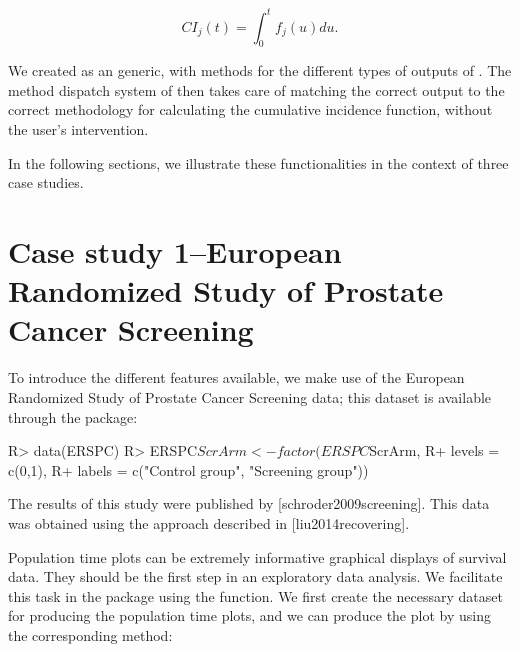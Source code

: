 \documentclass[
]{jss}
\begin{document}
\[ CI_j(t) = \int_0^t f_j(u)du.\]

We created  as an  generic, with methods for
the different types of outputs of . The method
dispatch system of  then takes care of matching the correct
output to the correct methodology for calculating the cumulative
incidence function, without the user's intervention.

In the following sections, we illustrate these functionalities in the
context of three case studies.

\hypertarget{case-study-1european-randomized-study-of-prostate-cancer-screening}{%
\section{Case study 1--European Randomized Study of Prostate Cancer
Screening}\label{case-study-1european-randomized-study-of-prostate-cancer-screening}}

To introduce the different features available, we make use of the
European Randomized Study of Prostate Cancer Screening data; this
dataset is available through the  package:

\begin{CodeChunk}

\begin{CodeInput}
R> data(ERSPC)
R> ERSPC$ScrArm <- factor(ERSPC$ScrArm, 
R+                        levels = c(0,1), 
R+                        labels = c("Control group", "Screening group"))
\end{CodeInput}
\end{CodeChunk}

The results of this study were published by {[}schroder2009screening{]}.
This data was obtained using the approach described in
{[}liu2014recovering{]}.

Population time plots can be extremely informative graphical displays of
survival data. They should be the first step in an exploratory data
analysis. We facilitate this task in the  package using
the  function. We first create the necessary dataset for
producing the population time plots, and we can produce the plot by
using the corresponding  method:
\end{document}
